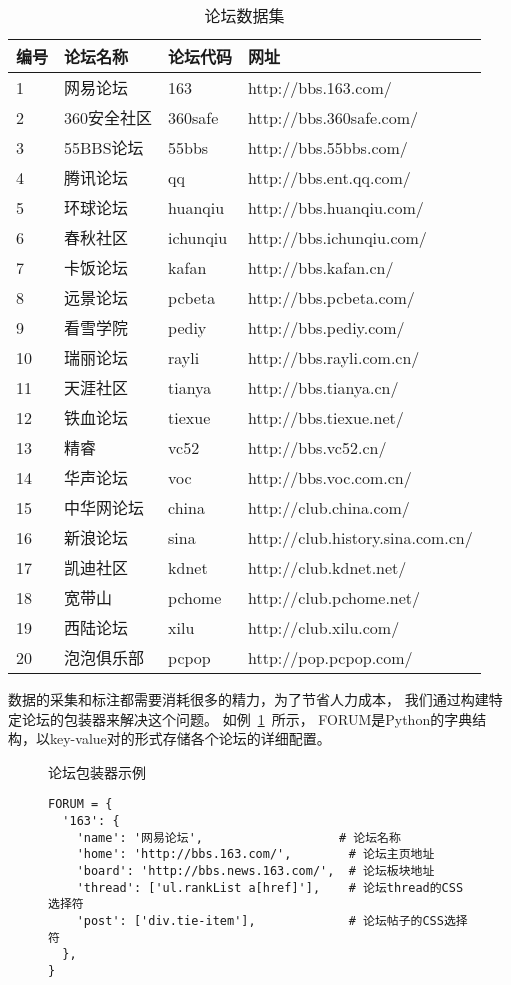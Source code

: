 \begin{table}[htbp]
\caption{论坛数据集}
\label{tbl:forum-dataset}
\vspace{0.5em}\centering\wuhao
\begin{tabular}{llll}
\toprule[1.5pt]
编号 & 论坛名称 & 论坛代码 & 网址 \\
\midrule[1pt]
1 & 网易论坛 & 163 & http://bbs.163.com/ \\
2 & 360安全社区 & 360safe & http://bbs.360safe.com/ \\
3 & 55BBS论坛 & 55bbs & http://bbs.55bbs.com/ \\
4 & 腾讯论坛 & qq & http://bbs.ent.qq.com/ \\
5 & 环球论坛 & huanqiu & http://bbs.huanqiu.com/ \\
6 & 春秋社区 & ichunqiu & http://bbs.ichunqiu.com/ \\
7 & 卡饭论坛 & kafan & http://bbs.kafan.cn/ \\
8 & 远景论坛 & pcbeta & http://bbs.pcbeta.com/ \\
9 & 看雪学院 & pediy & http://bbs.pediy.com/ \\
10 & 瑞丽论坛 & rayli & http://bbs.rayli.com.cn/ \\
11 & 天涯社区 & tianya & http://bbs.tianya.cn/ \\
12 & 铁血论坛 & tiexue & http://bbs.tiexue.net/ \\
13 & 精睿 & vc52 & http://bbs.vc52.cn/ \\
14 & 华声论坛 & voc & http://bbs.voc.com.cn/ \\
15 & 中华网论坛 & china & http://club.china.com/ \\
16 & 新浪论坛 & sina & http://club.history.sina.com.cn/ \\
17 & 凯迪社区 & kdnet & http://club.kdnet.net/ \\
18 & 宽带山 & pchome & http://club.pchome.net/ \\
19 & 西陆论坛 & xilu & http://club.xilu.com/ \\
20 & 泡泡俱乐部 & pcpop & http://pop.pcpop.com/ \\
\bottomrule[1.5pt]
\end{tabular}
\end{table}

数据的采集和标注都需要消耗很多的精力，为了节省人力成本，
我们通过构建特定论坛的包装器来解决这个问题。
如例~\ref{ex:forum-wrapper}~所示，
FORUM是Python的字典结构，以key-value对的形式存储各个论坛的详细配置。

\begin{figure}[htbp]
\begin{example}
\label{ex:forum-wrapper}
论坛包装器示例
\end{example}
\begin{verbatim}
FORUM = {
  '163': {
    'name': '网易论坛',                   # 论坛名称
    'home': 'http://bbs.163.com/',        # 论坛主页地址
    'board': 'http://bbs.news.163.com/',  # 论坛板块地址
    'thread': ['ul.rankList a[href]'],    # 论坛thread的CSS选择符 
    'post': ['div.tie-item'],             # 论坛帖子的CSS选择符
  },
}
\end{verbatim}
\end{figure}

